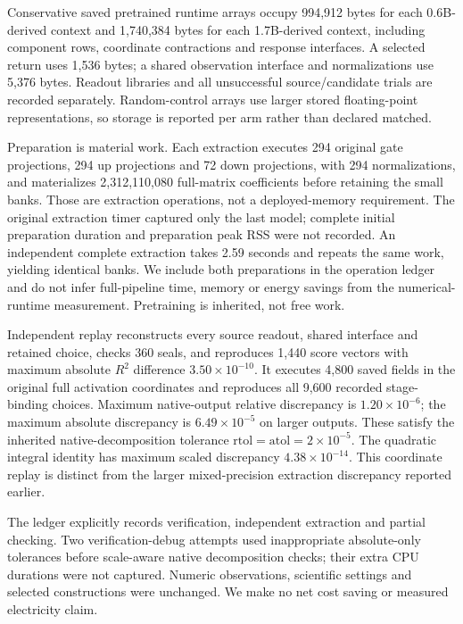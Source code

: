 \documentclass[11pt]{article}
\begin{document}
Conservative saved pretrained runtime arrays occupy 994,912 bytes for each 0.6B-derived context and 1,740,384 bytes for each 1.7B-derived context, including component rows, coordinate contractions and response interfaces. A selected return uses 1,536 bytes; a shared observation interface and normalizations use 5,376 bytes. Readout libraries and all unsuccessful source/candidate trials are recorded separately. Random-control arrays use larger stored floating-point representations, so storage is reported per arm rather than declared matched.

Preparation is material work. Each extraction executes 294 original gate projections, 294 up projections and 72 down projections, with 294 normalizations, and materializes 2,312,110,080 full-matrix coefficients before retaining the small banks. Those are extraction operations, not a deployed-memory requirement. The original extraction timer captured only the last model; complete initial preparation duration and preparation peak RSS were not recorded. An independent complete extraction takes 2.59 seconds and repeats the same work, yielding identical banks. We include both preparations in the operation ledger and do not infer full-pipeline time, memory or energy savings from the numerical-runtime measurement. Pretraining is inherited, not free work.

Independent replay reconstructs every source readout, shared interface and retained choice, checks 360 seals, and reproduces 1,440 score vectors with maximum absolute $R^2$ difference $3.50\times10^{-10}$. It executes 4,800 saved fields in the original full activation coordinates and reproduces all 9,600 recorded stage-binding choices. Maximum native-output relative discrepancy is $1.20\times10^{-6}$; the maximum absolute discrepancy is $6.49\times10^{-5}$ on larger outputs. These satisfy the inherited native-decomposition tolerance $\mathrm{rtol}=\mathrm{atol}=2\times10^{-5}$. The quadratic integral identity has maximum scaled discrepancy $4.38\times10^{-14}$. This coordinate replay is distinct from the larger mixed-precision extraction discrepancy reported earlier.

The ledger explicitly records verification, independent extraction and partial checking. Two verification-debug attempts used inappropriate absolute-only tolerances before scale-aware native decomposition checks; their extra CPU durations were not captured. Numeric observations, scientific settings and selected constructions were unchanged. We make no net cost saving or measured electricity claim.
\end{document}
